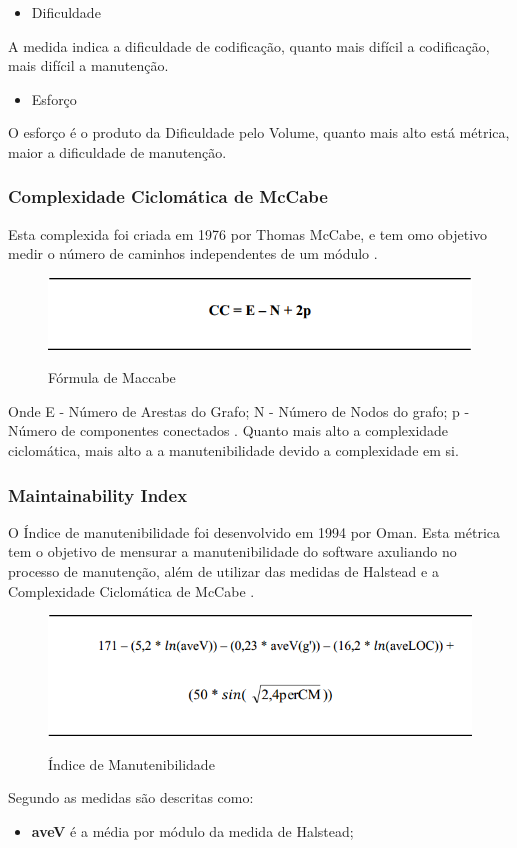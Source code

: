 \begin{itemize}
\item Dificuldade
\end{itemize}
A medida indica a dificuldade de codificação, quanto mais difícil a codificação, mais difícil a manutenção.

\begin{itemize}
\item Esforço
\end{itemize}
O esforço é o produto da Dificuldade pelo Volume, quanto mais alto está métrica, maior a dificuldade de manutenção.

\subsubsection{Complexidade Ciclomática de McCabe}
Esta complexida foi criada em 1976  por Thomas McCabe, e tem omo objetivo medir o número de caminhos independentes de um módulo \cite{isaias2012}.

\begin{figure}[tbh]
\centering
\caption[Fórmula de Maccabe]{Fórmula de Maccabe}
\includegraphics[width=0.7\linewidth]{./images/maccabe}
\label{fig:maccabe}
\end{figure}
Onde E - Número de Arestas do Grafo; N - Número de Nodos do grafo; p - Número de componentes conectados \cite{isaias2012}. Quanto mais alto a complexidade ciclomática, mais alto a a manutenibilidade devido a complexidade em si.

\subsubsection{Maintainability Index }
O Índice de manutenibilidade foi desenvolvido em 1994 por Oman. Esta métrica tem o objetivo de mensurar a manutenibilidade do software axuliando no processo de manutenção, além de utilizar das medidas de Halstead e a Complexidade Ciclomática de McCabe \cite{isaias2012}.
\begin{figure}[tbh]
\centering
\caption[Índice de Manutenibilidade]{Índice de Manutenibilidade}
\includegraphics[width=0.7\linewidth]{./images/MI}
\label{fig:MI}
\end{figure}
Segundo  as medidas são descritas como:
\begin{itemize}
 \item \textbf{aveV} é a média por módulo da medida de Halstead;
\end{itemize}

